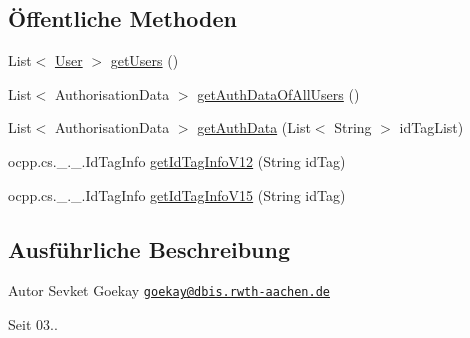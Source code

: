 \subsection*{Öffentliche Methoden}
\begin{DoxyCompactItemize}
\item 
List$<$ \hyperlink{classde_1_1rwth_1_1idsg_1_1steve_1_1repository_1_1dto_1_1_user}{User} $>$ \hyperlink{classde_1_1rwth_1_1idsg_1_1steve_1_1service_1_1_user_service_impl_aad84fa4447be5f261a4a5915dd37e4d0}{get\-Users} ()
\item 
List$<$ Authorisation\-Data $>$ \hyperlink{classde_1_1rwth_1_1idsg_1_1steve_1_1service_1_1_user_service_impl_a35fcb39f2721487107b366cd5f8e75d7}{get\-Auth\-Data\-Of\-All\-Users} ()
\item 
List$<$ Authorisation\-Data $>$ \hyperlink{classde_1_1rwth_1_1idsg_1_1steve_1_1service_1_1_user_service_impl_aac6d82c69dd696c9dd78035c125cac3e}{get\-Auth\-Data} (List$<$ String $>$ id\-Tag\-List)
\item 
ocpp.\-cs.\-\_.\-\_.\-Id\-Tag\-Info \hyperlink{classde_1_1rwth_1_1idsg_1_1steve_1_1service_1_1_user_service_impl_aa3874903729e4fe0d3737aa80236b403}{get\-Id\-Tag\-Info\-V12} (String id\-Tag)
\item 
ocpp.\-cs.\-\_.\-\_.\-Id\-Tag\-Info \hyperlink{classde_1_1rwth_1_1idsg_1_1steve_1_1service_1_1_user_service_impl_ada96bec96516325c7a2368dfa22958a2}{get\-Id\-Tag\-Info\-V15} (String id\-Tag)
\end{DoxyCompactItemize}


\subsection{Ausführliche Beschreibung}
\begin{DoxyAuthor}{Autor}
Sevket Goekay \href{mailto:goekay@dbis.rwth-aachen.de}{\tt goekay@dbis.\-rwth-\/aachen.\-de} 
\end{DoxyAuthor}
\begin{DoxySince}{Seit}
03.. 
\end{DoxySince}


